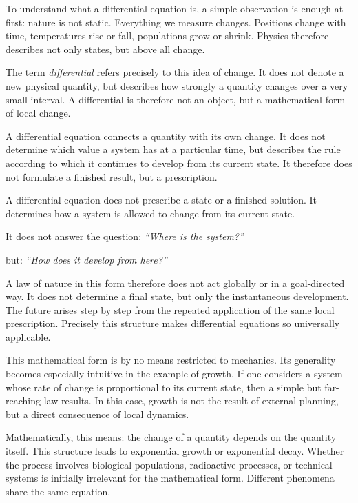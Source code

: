 To understand what a differential equation is,
a simple observation is enough at first:
nature is not static.
Everything we measure changes.
Positions change with time,
temperatures rise or fall,
populations grow or shrink.
Physics therefore describes not only states,
but above all change.

The term \emph{differential}
refers precisely to this idea of change.
It does not denote a new physical quantity,
but describes
how strongly a quantity changes over a very small interval.
A differential is therefore not an object,
but a mathematical form of local change.

A differential equation connects a quantity
with its own change.
It does not determine
which value a system has at a particular time,
but describes the rule
according to which it continues to develop
from its current state.
It therefore does not formulate a finished result,
but a prescription.

\begin{DidacticBox}
	\label{box:differential}
	A differential equation does not prescribe a state
	or a finished solution.
	It determines
	how a system is allowed to change from its current state.
	
	It does not answer the question:
	\emph{``Where is the system?''}
	
	but:
	\emph{``How does it develop from here?''}
\end{DidacticBox}

A law of nature in this form
therefore does not act globally or in a goal-directed way.
It does not determine a final state,
but only the instantaneous development.
The future arises step by step
from the repeated application of the same local prescription.
Precisely this structure makes differential equations
so universally applicable.

This mathematical form is by no means
restricted to mechanics.
Its generality becomes especially intuitive
in the example of growth.
If one considers a system
whose rate of change is proportional to its current state,
then a simple
but far-reaching law results.
In this case, growth is
not the result of external planning,
but a direct consequence of local dynamics.

Mathematically, this means:
the change of a quantity depends on the quantity itself.
This structure leads to exponential growth
or exponential decay.
Whether the process involves biological populations,
radioactive processes,
or technical systems
is initially irrelevant for the mathematical form.
Different phenomena share the same equation.

